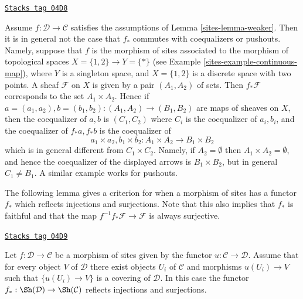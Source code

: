 \begin{example}
\label{sites-example-weaker-not-coequalizer}
\href{https://stacks.math.columbia.edu/tag/04D8}{\texttt{Stacks tag 04D8}}

Assume $f : \mathcal{D} \to \mathcal{C}$ satisfies the assumptions of
Lemma \ref{sites-lemma-weaker}.
Then it is in general not the case that $f_*$ commutes with coequalizers
or pushouts. Namely, suppose that $f$ is the morphism of sites associated
to the morphism of topological spaces $X = \{1, 2\} \to Y = \{*\}$ (see
Example \ref{sites-example-continuous-map}),
where $Y$ is a singleton space, and $X = \{1, 2\}$ is a discrete
space with two points. A sheaf $\mathcal{F}$ on $X$ is given by a pair
$(A_1, A_2)$ of sets. Then $f_*\mathcal{F}$ corresponds to the
set $A_1 \times A_2$. Hence if
$a = (a_1, a_2), b = (b_1, b_2) : (A_1, A_2) \to (B_1, B_2)$
are maps of sheaves on $X$, then the
coequalizer of $a, b$ is $(C_1, C_2)$ where $C_i$ is the coequalizer of
$a_i, b_i$, and the coequalizer of $f_*a, f_*b$ is the coequalizer of
$$
a_1 \times a_2, b_1 \times b_2 :
A_1 \times A_2 \longrightarrow B_1 \times B_2
$$
which is in general different from $C_1 \times C_2$. Namely, if
$A_2 = \emptyset$ then $A_1 \times A_2 = \emptyset$, and hence the
coequalizer of the displayed arrows is $B_1 \times B_2$, but in general
$C_1 \not = B_1$. A similar example works for pushouts.
\end{example}

The following lemma gives a criterion for when a morphism of sites
has a functor $f_*$ which reflects injections and surjections.
Note that this also implies that $f_*$ is faithful and that the
map $f^{-1}f_*\mathcal{F} \to \mathcal{F}$ is always surjective.

\begin{lemma}
\label{sites-lemma-cover-from-below}
\href{https://stacks.math.columbia.edu/tag/04D9}{\texttt{Stacks tag 04D9}}

Let $f : \mathcal{D} \to \mathcal{C}$ be a morphism of sites given
by the functor $u : \mathcal{C} \to \mathcal{D}$.
Assume that for every object $V$ of $\mathcal{D}$ there exist objects
$U_i$ of $\mathcal{C}$ and morphisms $u(U_i) \to V$ such that
$\{u(U_i) \to V\}$ is a covering of $\mathcal{D}$. In this case the functor
$f_* : \Sh(\mathcal{D}) \to \Sh(\mathcal{C})$ reflects
injections and surjections.
\end{lemma}

